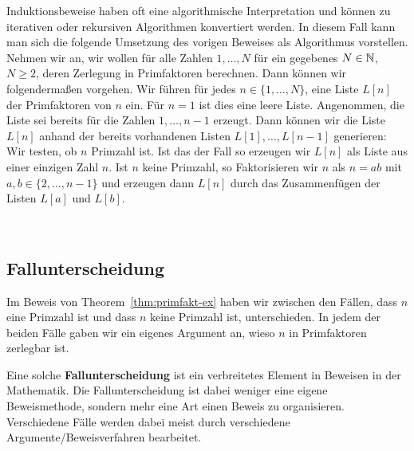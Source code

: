 \begin{bem}
	Induktionsbeweise haben oft eine algorithmische Interpretation und können zu iterativen oder rekursiven Algorithmen konvertiert werden. In diesem Fall kann man sich die folgende Umsetzung des vorigen Beweises als Algorithmus vorstellen. Nehmen wir an, wir wollen für alle Zahlen $1,\ldots,N$ für ein gegebenes $N \in \mathbb{N}$, $N \ge 2$, deren Zerlegung in Primfaktoren berechnen. Dann können wir folgendermaßen vorgehen. Wir führen für jedes $n \in \{1,\ldots,N\}$, eine Liste $L[n]$ der Primfaktoren von $n$ ein. Für $n=1$ ist dies eine leere Liste. Angenommen, die Liste sei bereits für die Zahlen $1,\ldots,n-1$ erzeugt. Dann können wir die Liste $L[n]$ anhand der bereits vorhandenen Listen $L[1],\ldots,L[n-1]$ generieren: Wir testen, ob $n$ Primzahl ist. Ist das der Fall so erzeugen wir $L[n]$ als Liste aus einer einzigen Zahl $n$. Ist $n$ keine Primzahl, so Faktorisieren wir $n$ als $n = ab$ mit $a,b \in \{2,\ldots,n-1\}$ und erzeugen dann $L[n]$ durch das Zusammenfügen der Listen $L[a]$ und $L[b]$. 
\end{bem} 

\begin{bem}\
	
	
	
\end{bem} 

\subsection{Fallunterscheidung} 

\begin{bem}
Im Beweis von Theorem~\ref{thm:primfakt-ex} haben wir zwischen den Fällen, dass $n$ eine Primzahl ist und dass $n$ keine Primzahl ist, unterschieden. In jedem der beiden Fälle gaben wir ein eigenes Argument an, wieso $n$ in Primfaktoren zerlegbar ist.  

	Eine solche \textbf{Fallunterscheidung} ist ein verbreitetes Element in Beweisen in der Mathematik.
	Die Fallunterscheidung ist dabei weniger eine eigene Beweismethode, sondern mehr eine Art einen Beweis zu organisieren.
	Verschiedene Fälle werden dabei meist durch verschiedene Argumente/Beweisverfahren bearbeitet.
\end{bem} 


